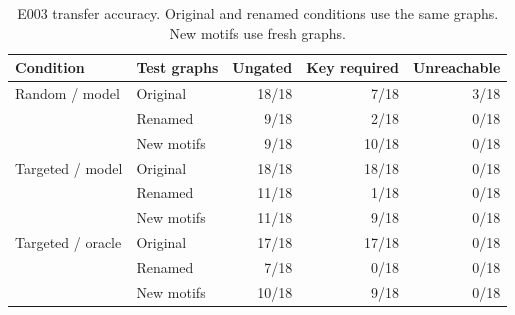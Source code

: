 \begin{table}[H]
\centering
\caption{E003 transfer accuracy. Original and renamed conditions use the same graphs. New motifs use fresh graphs.}
\label{tab:e003-transfer}
\begin{tabular}{llrrr}
\toprule
Condition & Test graphs & Ungated & Key required & Unreachable \\
\midrule
Random / model & Original & 18/18 & 7/18 & 3/18 \\
 & Renamed & 9/18 & 2/18 & 0/18 \\
 & New motifs & 9/18 & 10/18 & 0/18 \\
\addlinespace
Targeted / model & Original & 18/18 & 18/18 & 0/18 \\
 & Renamed & 11/18 & 1/18 & 0/18 \\
 & New motifs & 11/18 & 9/18 & 0/18 \\
\addlinespace
Targeted / oracle & Original & 17/18 & 17/18 & 0/18 \\
 & Renamed & 7/18 & 0/18 & 0/18 \\
 & New motifs & 10/18 & 9/18 & 0/18 \\
\bottomrule
\end{tabular}
\end{table}
